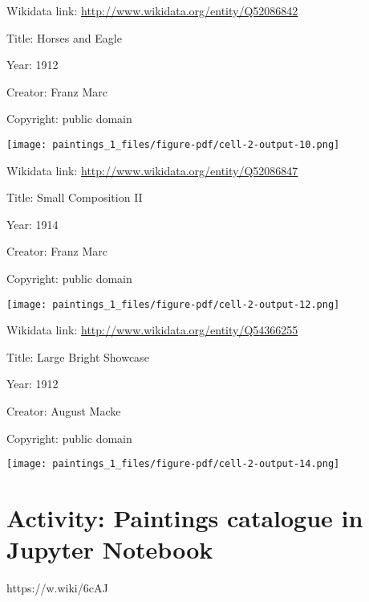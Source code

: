 \documentclass[
  letterpaper,
]{book}
\begin{document}
Wikidata link: \url{http://www.wikidata.org/entity/Q52086842}

Title: Horses and Eagle

Year: 1912

Creator: Franz Marc

Copyright: public domain

\texttt{[image: paintings\_1\_files/figure-pdf/cell-2-output-10.png]}

Wikidata link: \url{http://www.wikidata.org/entity/Q52086847}

Title: Small Composition II

Year: 1914

Creator: Franz Marc

Copyright: public domain

\texttt{[image: paintings\_1\_files/figure-pdf/cell-2-output-12.png]}

Wikidata link: \url{http://www.wikidata.org/entity/Q54366255}

Title: Large Bright Showcase

Year: 1912

Creator: August Macke

Copyright: public domain

\texttt{[image: paintings\_1\_files/figure-pdf/cell-2-output-14.png]}


\hypertarget{activity-paintings-catalogue-in-jupyter-notebook}{%
\chapter{Activity: Paintings catalogue in Jupyter
Notebook}\label{activity-paintings-catalogue-in-jupyter-notebook}}

https://w.wiki/6cAJ
\end{document}
